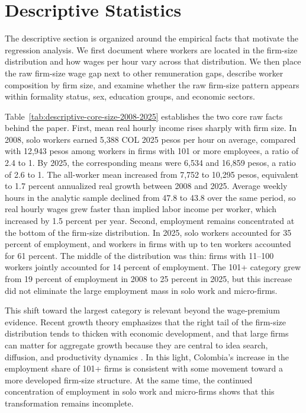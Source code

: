 \section{Descriptive Statistics}

The descriptive section is organized around the empirical facts that motivate the regression analysis. We first document where workers are located in the firm-size distribution and how wages per hour vary across that distribution. We then
place the raw firm-size wage gap next to other remuneration gaps, describe worker composition by firm size, and examine whether the raw firm-size pattern appears within formality status, sex, education groups, and economic sectors.

Table~\ref{tab:descriptive-core-size-2008-2025} establishes the two core raw facts behind the paper. First, mean real hourly income rises sharply with firm size. In 2008, solo workers earned 5,388 COL 2025 pesos per hour on average, compared with 12,943 pesos among workers in firms with 101 or more employees, a ratio of 2.4 to 1. By 2025, the corresponding means were 6,534 and 16,859 pesos, a ratio of 2.6 to 1. The all-worker mean increased from 7,752 to 10,295 pesos, equivalent to 1.7 percent annualized real growth between 2008 and 2025. Average weekly hours in the analytic sample declined from 47.8 to 43.8 over the same period, so real hourly wages grew faster than implied labor income per worker, which increased by 1.5 percent per year. Second, employment remains concentrated at the bottom of the firm-size distribution. In 2025, solo workers accounted for 35 percent of employment, and workers in firms with up to ten workers accounted for 61 percent. The middle of the distribution was thin: firms with 11--100 workers jointly accounted for 14 percent of employment. The 101+ category grew from 19 percent of employment in 2008 to 25 percent in 2025, but this increase did not eliminate the large employment mass in solo work and micro-firms.



This shift toward the largest category is relevant beyond the wage-premium
evidence. Recent growth theory emphasizes that the right tail of the firm-size
distribution tends to thicken with economic development, and that large firms
can matter for aggregate growth because they are central to idea search,
diffusion, and productivity dynamics \citep{Chen2026}. In this light,
Colombia's increase in the employment share of 101+ firms is consistent with
some movement toward a more developed firm-size structure. At the same time, the
continued concentration of employment in solo work and micro-firms shows that
this transformation remains incomplete.

